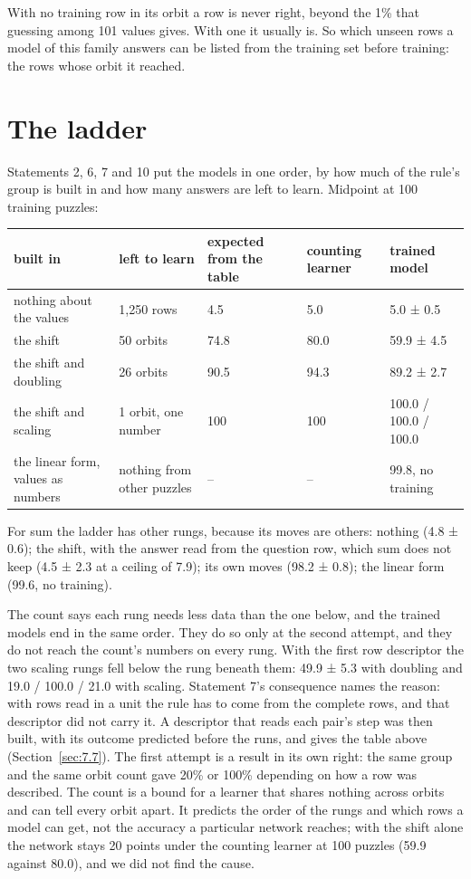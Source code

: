 With no training row in its orbit a row is never right, beyond the 1\% that guessing among 101 values gives. With one it usually is. So which unseen rows a model of this family answers can be listed from the training set before training: the rows whose orbit it reached.

\section{The ladder}\label{sec:3.7}

Statements 2, 6, 7 and 10 put the models in one order, by how much of the rule's group is built in and how many answers are left to learn. Midpoint at 100 training puzzles:

\begin{center}\small
\begin{tabularx}{\linewidth}{@{}YYYlY@{}}
\toprule
built in & left to learn & expected from the table & counting learner & trained model \\
\midrule
nothing about the values & 1,250 rows & 4.5 & 5.0 & 5.0 ± 0.5 \\
the shift & 50 orbits & 74.8 & 80.0 & 59.9 ± 4.5 \\
the shift and doubling & 26 orbits & 90.5 & 94.3 & 89.2 ± 2.7 \\
the shift and scaling & 1 orbit, one number & 100 & 100 & 100.0 / 100.0 / 100.0 \\
the linear form, values as numbers & nothing from other puzzles & – & – & 99.8, no training \\
\bottomrule
\end{tabularx}
\end{center}

For sum the ladder has other rungs, because its moves are others: nothing (4.8 ± 0.6); the shift, with the answer read from the question row, which sum does not keep (4.5 ± 2.3 at a ceiling of 7.9); its own moves (98.2 ± 0.8); the linear form (99.6, no training).

The count says each rung needs less data than the one below, and the trained models end in the same order. They do so only at the second attempt, and they do not reach the count's numbers on every rung. With the first row descriptor the two scaling rungs fell below the rung beneath them: 49.9 ± 5.3 with doubling and 19.0 / 100.0 / 21.0 with scaling. Statement 7's consequence names the reason: with rows read in a unit the rule has to come from the complete rows, and that descriptor did not carry it. A descriptor that reads each pair's step was then built, with its outcome predicted before the runs, and gives the table above (Section~\ref{sec:7.7}). The first attempt is a result in its own right: the same group and the same orbit count gave 20\% or 100\% depending on how a row was described. The count is a bound for a learner that shares nothing across orbits and can tell every orbit apart. It predicts the order of the rungs and which rows a model can get, not the accuracy a particular network reaches; with the shift alone the network stays 20 points under the counting learner at 100 puzzles (59.9 against 80.0), and we did not find the cause.

